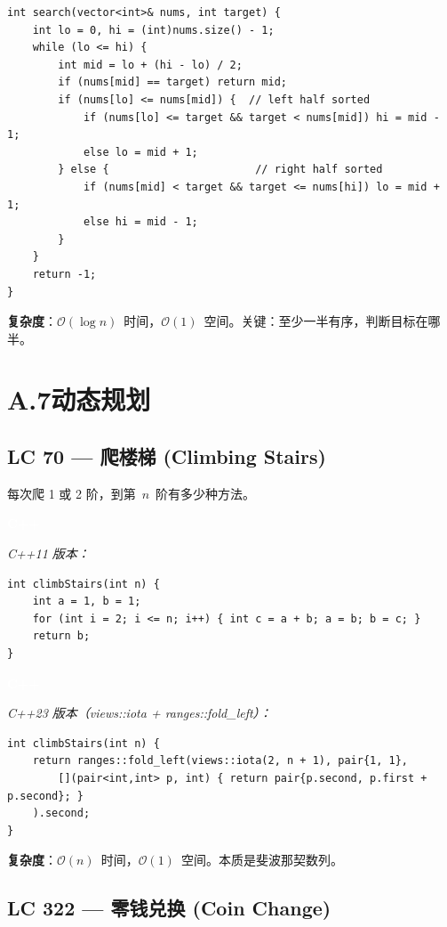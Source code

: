 \documentclass[12pt,a4paper,fontset=fandol]{ctexbook}
\newcommand{\cpplabel}{%
  \noindent\begin{tcolorbox}[sharp corners,colback=cppheadbg,colframe=cppheadbg,
    left=6pt,right=6pt,top=2pt,bottom=2pt,boxrule=0pt]
  \textcolor{white}{\small\bfseries\sffamily C++}\end{tcolorbox}%
}
\newcommand{\bigO}[1]{\mathcal{O}(#1)}
\begin{document}
\begin{lstlisting}[style=cppstyle]
int search(vector<int>& nums, int target) {
    int lo = 0, hi = (int)nums.size() - 1;
    while (lo <= hi) {
        int mid = lo + (hi - lo) / 2;
        if (nums[mid] == target) return mid;
        if (nums[lo] <= nums[mid]) {  // left half sorted
            if (nums[lo] <= target && target < nums[mid]) hi = mid - 1;
            else lo = mid + 1;
        } else {                       // right half sorted
            if (nums[mid] < target && target <= nums[hi]) lo = mid + 1;
            else hi = mid - 1;
        }
    }
    return -1;
}
\end{lstlisting}
\textbf{复杂度}：$\bigO{\log n}$~时间，$\bigO{1}$~空间。关键：至少一半有序，判断目标在哪半。

\section*{A.7\quad 动态规划}

\subsection*{LC 70 — 爬楼梯 (Climbing Stairs)}

每次爬 1 或 2 阶，到第~$n$~阶有多少种方法。

\cpplabel\noindent\textit{C++11 版本：}
\begin{lstlisting}[style=cppstyle]
int climbStairs(int n) {
    int a = 1, b = 1;
    for (int i = 2; i <= n; i++) { int c = a + b; a = b; b = c; }
    return b;
}
\end{lstlisting}

\cpplabel\noindent\textit{C++23 版本（views::iota + ranges::fold\_left）：}
\begin{lstlisting}[style=cppstyle]
int climbStairs(int n) {
    return ranges::fold_left(views::iota(2, n + 1), pair{1, 1},
        [](pair<int,int> p, int) { return pair{p.second, p.first + p.second}; }
    ).second;
}
\end{lstlisting}
\textbf{复杂度}：$\bigO{n}$~时间，$\bigO{1}$~空间。本质是斐波那契数列。

\subsection*{LC 322 — 零钱兑换 (Coin Change)}
\end{document}
